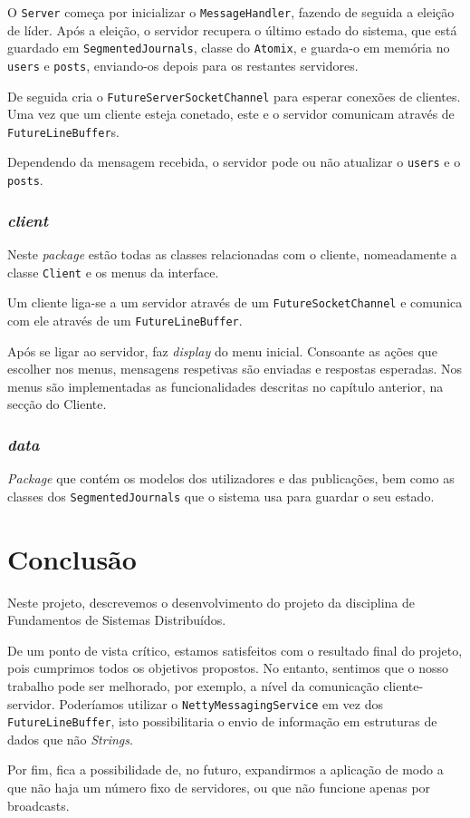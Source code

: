 \documentclass[12pt, a4paper]{report}
\begin{document}
O \texttt{Server} começa por inicializar o \texttt{MessageHandler}, fazendo de seguida a eleição de líder.
Após a eleição, o servidor recupera o último estado do sistema, que está guardado em \texttt{SegmentedJournals}, classe do \texttt{Atomix}, e guarda-o em memória no \texttt{users} e \texttt{posts}, enviando-os depois para os restantes servidores.

De seguida cria o \texttt{FutureServerSocketChannel} para esperar conexões de clientes.
Uma vez que um cliente esteja conetado, este e o servidor comunicam através de \texttt{FutureLineBuffer}s.

Dependendo da mensagem recebida, o servidor pode ou não atualizar o \texttt{users} e o \texttt{posts}.



\subsection{\textit{client}}
Neste \textit{package} estão todas as classes relacionadas com o cliente, nomeadamente a classe \texttt{Client} e os menus da interface.

Um cliente liga-se a um servidor através de um \texttt{FutureSocketChannel} e comunica com ele através de um \texttt{FutureLineBuffer}.

Após se ligar ao servidor, faz \textit{display} do menu inicial.
Consoante as ações que escolher nos menus, mensagens respetivas são enviadas e respostas esperadas.
Nos menus são implementadas as funcionalidades descritas no capítulo anterior, na secção do Cliente.


\subsection{\textit{data}}
\textit{Package} que contém os modelos dos utilizadores e das publicações, bem como as classes dos \texttt{SegmentedJournals} que o sistema usa para guardar o seu estado.


\chapter{Conclusão}
Neste projeto, descrevemos o desenvolvimento do projeto da disciplina de Fundamentos de Sistemas Distribuídos.

De um ponto de vista crítico, estamos satisfeitos com o resultado final do projeto, pois cumprimos todos os objetivos propostos.
No entanto, sentimos que o nosso trabalho pode ser melhorado, por exemplo, a nível da comunicação cliente-servidor. Poderíamos utilizar o \texttt{NettyMessagingService} em vez dos \texttt{FutureLineBuffer}, isto possibilitaria o envio de informação em estruturas de dados que não \textit{Strings}.

Por fim, fica a possibilidade de, no futuro, expandirmos a aplicação de modo a que não haja um número fixo de servidores, ou que não funcione apenas por broadcasts.
\end{document}
